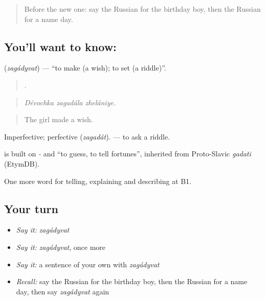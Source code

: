 \label{lesson:RU-C317-zagadyvat}



\begin{quote}
Before the new one: say the Russian for the birthday boy, then the Russian for a name day.
\end{quote}

\subsection*{You'll want to know: }
\textbf{} (\emph{zagádyvat}) — \textquotedblleft{}to make (a wish); to set (a riddle)\textquotedblright{}.

\begin{quote}
  .
\end{quote}

\begin{quote}
\emph{Dévochka zagadála zhelániye.}
\end{quote}

\begin{quote}
The girl made a wish.
\end{quote}

Imperfective; perfective \emph{} (\emph{zagadát}). \emph{ } — to ask a riddle.

\begin{cousinweb}
\emph{} is built on \emph{-} and \emph{} \textquotedblleft{}to guess, to tell fortunes\textquotedblright{}, inherited from Proto-Slavic \emph{gadati} (EtymDB).
\end{cousinweb}

\begin{grammarlens}[title={What you've built}]
One more word for telling, explaining and describing at B1.
\end{grammarlens}

\subsection*{Your turn}
\begin{itemize}
\raggedright
  \item \emph{Say it:} \emph{zagádyvat}
  \item \emph{Say it:} \emph{zagádyvat}, once more
  \item \emph{Say it:} a sentence of your own with \emph{zagádyvat}
  \item \emph{Recall:} say the Russian for the birthday boy, then the Russian for a name day, then say \emph{zagádyvat} again
\end{itemize}

